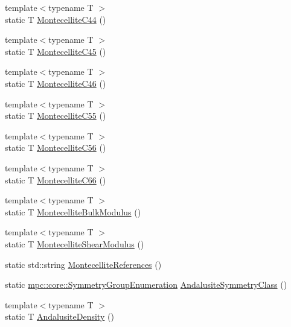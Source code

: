 \begin{DoxyCompactItemize}
\item 
{\footnotesize template$<$typename T $>$ }\\static T \mbox{\hyperlink{namespacempc_1_1data_a6180ad0bfa9aac1c838e80856e5d9d7c}{Montecellite\+C44}} ()
\item 
{\footnotesize template$<$typename T $>$ }\\static T \mbox{\hyperlink{namespacempc_1_1data_a85ebc44f7e78acc59031f580e60a2a89}{Montecellite\+C45}} ()
\item 
{\footnotesize template$<$typename T $>$ }\\static T \mbox{\hyperlink{namespacempc_1_1data_a2e904d2b4b94d2121089c18c3ae7a3fb}{Montecellite\+C46}} ()
\item 
{\footnotesize template$<$typename T $>$ }\\static T \mbox{\hyperlink{namespacempc_1_1data_af0f1890fcfed749102014397f2166c92}{Montecellite\+C55}} ()
\item 
{\footnotesize template$<$typename T $>$ }\\static T \mbox{\hyperlink{namespacempc_1_1data_a966593f69ce157389a1f8523b730f7f0}{Montecellite\+C56}} ()
\item 
{\footnotesize template$<$typename T $>$ }\\static T \mbox{\hyperlink{namespacempc_1_1data_ae27d463fdc11aa222d7628d2887e548d}{Montecellite\+C66}} ()
\item 
{\footnotesize template$<$typename T $>$ }\\static T \mbox{\hyperlink{namespacempc_1_1data_a3a5ad6b593ca8b12aa64bb13f8fac8f2}{Montecellite\+Bulk\+Modulus}} ()
\item 
{\footnotesize template$<$typename T $>$ }\\static T \mbox{\hyperlink{namespacempc_1_1data_a8298960013b1962963c082eb3cc83450}{Montecellite\+Shear\+Modulus}} ()
\item 
static std\+::string \mbox{\hyperlink{namespacempc_1_1data_abaf7bc3a2916436ace6cbf41d2fd737a}{Montecellite\+References}} ()
\item 
static \mbox{\hyperlink{namespacempc_1_1core_a9d979684062547055a0ef5c13077bad8}{mpc\+::core\+::\+Symmetry\+Group\+Enumeration}} \mbox{\hyperlink{namespacempc_1_1data_a4e19ba7dc81d8b195da2a22f204f76ce}{Andalusite\+Symmetry\+Class}} ()
\item 
{\footnotesize template$<$typename T $>$ }\\static T \mbox{\hyperlink{namespacempc_1_1data_a6b5229ce583401e9360561a864f3525a}{Andalusite\+Density}} ()
\item 

\end{DoxyCompactItemize}
